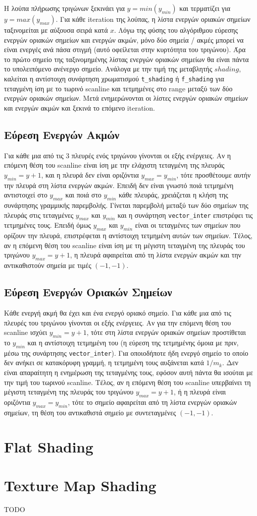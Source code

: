 \documentclass{article}
\begin{document}
Η λούπα πλήρωσης τριγώνων ξεκινάει για $y = min(y_{min})$ και τερματίζει για
$y = max(y_{max})$. Για κάθε iteration της λούπας, η λίστα ενεργών οριακών 
σημείων ταξινομείται με αύξουσα σειρά κατά $x$. Λόγω της φύσης του αλγόριθμου 
εύρεσης ενεργών οριακών σημείων και ενεργών ακμών, μόνο δύο σημεία / ακμές 
μπορεί να είναι ενεργές ανά πάσα στιγμή (αυτό οφείλεται στην κυρτότητα του
τριγώνου). Άρα το πρώτο σημείο της ταξινομημένης λίστας ενεργών οριακών σημείων
θα είναι πάντα το υπολειπόμενο ανένεργο σημείο. Ανάλογα με την τιμή της μεταβλητής 
$shading$, καλείται η αντίστοιχη συνάρτηση χρωματισμού \verb|t_shading| ή 
\verb|f_shading| για τεταγμένη ίση με το τωρινό scanline και τετμημένες στο range 
μεταξύ των δύο ενεργών οριακών σημείων. Μετά ενημερώνονται οι λίστες 
ενεργών οριακών σημείων και ενεργών ακμών και ξεκινά το επόμενο iteration.

\subsection{Εύρεση Ενεργών Ακμών}
Για κάθε μια από τις 3 πλευρές ενός τριγώνου γίνονται οι εξής ενέργειες.
Αν η επόμενη θέση του scanline είναι ίση με την ελάχιστη τεταγμένη της πλευράς
$y_{min} = y + 1$, και η πλευρά δεν είναι οριζόντια $y_{max} = y_{min}$, τότε 
προσθέτουμε αυτήν την πλευρά στη λίστα ενεργών ακμών. Επειδή δεν είναι
γνωστό ποιά τετμημένη αντιστοιχεί στο $y_{max}$ και ποιά στο $y_{min}$
κάθε πλευράς, χρειάζεται η κλήση της συνάρτησης γραμμικής παρεμβολής.
Γίνεται παρεμβολή μεταξύ των δύο σημείων της πλευράς στις τεταγμένες
$y_{max}$ και $y_{min}$ και η συνάρτηση \verb|vector_inter| επιστρέφει
τις τετμημένες τους. Επειδή
όμως $y_{max}$ και $y_{min}$ είναι οι τεταγμένες των σημείων που
ορίζουν την πλευρά,
επιστρέφεται η αντίστοιχη τετμημένη αυτών των σημείων.
Τέλος, αν η επόμενη θέση του scanline είναι ίση με τη μέγιστη τεταγμένη
της πλευράς του τριγώνου $y_{max} = y + 1$, η πλευρά αφαιρείται 
από τη λίστα ενεργών ακμών και την αντικαθιστούν σημεία με τιμές $(-1, -1)$.

\subsection{Εύρεση Ενεργών Οριακών Σημείων}
Κάθε ενεργή ακμή θα έχει και ένα ενεργό οριακό σημείο.
Για κάθε μια από τις πλευρές του τριγώνου γίνονται οι εξής ενέργειες.
Αν για την επόμενη θέση του scanline ισχύει $y_{min} = y + 1$, 
τότε στη λίστα ενεργών οριακών σημείων προστίθεται το $y_{min}$
και η αντίστοιχη τετμημένη του (η εύρεση της τετμημένης όμοια με 
πριν, μέσω της συνάρτησης \verb|vector_inter|). Για οποιοδήποτε 
ήδη ενεργό σημείο το οποίο δεν ανήκει σε κατακόρυφη γραμμή, η τετμημένη
τους αυξάνεται κατά $1 / m_k$. Δεν είναι απαραίτητη η ενημέρωση 
της τεταγμένης τους, εφόσον αυτή πάντα θα ισούται με την τιμή του τωρινού scanline.
Τέλος, αν η επόμενη θέση του scanline υπερβαίνει τη μέγιστη τεταγμένη
της πλευράς του τριγώνου $y_{max} = y + 1$, ή η πλευρά είναι οριζόντια 
$y_{max} = y_{min}$, τότε το σημείο αφαιρείται από τη λίστα ενεργών
οριακών σημείων, τη θέση του αντικαθιστά σημείο με συντεταγμένες 
$(-1, -1)$.

\section{Flat Shading}

\section{Texture Map Shading}
TODO
\end{document}
